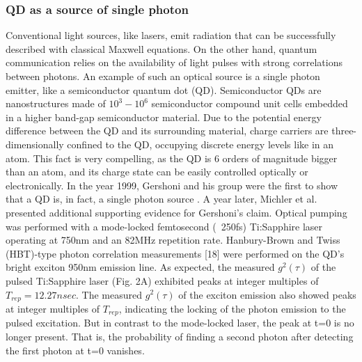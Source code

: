 \subsubsection{QD as a source of single photon}
Conventional light sources, like lasers, emit radiation that can be successfully described with classical Maxwell equations. On the other hand, quantum communication relies on the availability of light pulses with strong correlations between photons. An example of such an optical source is a single photon emitter, like a semiconductor quantum dot (QD). Semiconductor QDs are nanostructures made of $10^3-10^6$ semiconductor compound unit cells embedded in a higher band-gap semiconductor material. Due to the potential energy difference between the QD and its surrounding material, charge carriers are three-dimensionally confined to the QD, occupying discrete energy levels like in an atom. This fact is very compelling, as the QD is 6 orders of magnitude bigger than an atom, and its charge state can be easily controlled optically or electronically. 
In the year 1999, Gershoni and his group were the first to show that a QD is, in fact, a single photon source \cite{Dekel2000}. A year later, Michler et al.\cite{Michler2000} presented additional supporting evidence for Gershoni's claim. Optical pumping was performed with a mode-locked femtosecond (~250fs) Ti:Sapphire laser operating at 750nm and an 82MHz repetition rate. Hanbury-Brown and Twiss (HBT)-type photon correlation measurements [18] were performed on the QD's bright exciton 950nm emission line. As expected, the measured $g^2(\tau)$  of the pulsed Ti:Sapphire laser (Fig. 2A) exhibited peaks at integer multiples of  $T_{rep} =12.27 nsec$. The measured $g^2(\tau)$ of the exciton emission also showed peaks at integer multiples of $T_{rep}$, indicating the locking of the photon emission to the pulsed excitation. But in contrast to the mode-locked laser, the peak at t=0 is no longer present. That is, the probability of finding a second photon after detecting the first photon at t=0 vanishes.
